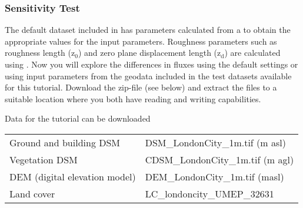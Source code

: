 \documentclass[letterpaper,10pt,english]{sphinxmanual}
\begin{document}
\subsubsection{Sensitivity Test}
\label{\detokenize{Tutorials/SuewsAdvanced:sensitivity-test}}
The default dataset included in  has parameters
calculated from a {\hyperref[\detokenize{pre-processor/Urban Morphology Source Area (Point):sourcearea-point}]{}}
to obtain the appropriate values for the input parameters. Roughness
parameters such as roughness length (z$_{\text{0}}$) and zero plane
displacement length (z$_{\text{d}}$) are calculated using .
Now you will explore the differences in fluxes using the default
settings or using input parameters from the geodata included in the test
datasets available for this tutorial. Download the zip-file (see below)
and extract the files to a suitable location where you both have reading
and writing capabilities.

Data for the tutorial can be downloaded


\begin{savenotes}\sphinxattablestart
\centering
\begin{tabulary}{\linewidth}[t]{|T|T|}
\hline

&
\\
\hline
Ground and building DSM
&
DSM\_LondonCity\_1m.tif (m asl)
\\
\hline
Vegetation DSM
&
CDSM\_LondonCity\_1m.tif (m agl)
\\
\hline
DEM (digital elevation model)
&
DEM\_LondonCity\_1m.tif (masl)
\\
\hline
Land cover
&
LC\_londoncity\_UMEP\_32631
\\
\hline
\end{tabulary}
\par
\sphinxattableend\end{savenotes}
\end{document}

